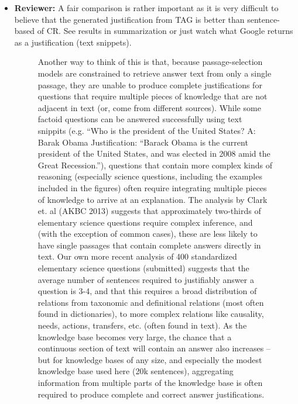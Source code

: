 \documentclass[10pt]{article}
\begin{document}
\begin{itemize}
\begin{itemize}
        \item \textbf{Reviewer:} A fair comparison is rather important as it is very difficult to believe
that the generated justification from TAG is better than sentence-based of
CR. See results in summarization or just watch what Google returns as a
justification (text snippets).

\begin{figure}[H]
\caption{ Another way to think of this is that, because passage-selection models are constrained to retrieve answer text from only a single passage, they are unable to produce complete justifications for questions that require multiple pieces of knowledge that are not adjacent in text (or, come from different sources).  While some factoid questions can be answered successfully using text snippits (e.g. ``Who is the president of the United States?  A: Barak Obama  Justification: ``Barack Obama is the current president of the United States, and was elected in 2008 amid the Great Recession.''), questions that contain more complex kinds of reasoning (especially science questions, including the examples included in the figures) often require integrating multiple pieces of knowledge to arrive at an explanation.  The analysis by Clark et. al (AKBC 2013) suggests that approximately two-thirds of elementary science questions require complex inference, and (with the exception of common cases), these are less likely to have single passages that contain complete answers directly in text.  Our own more recent analysis of 400 standardized elementary science questions (submitted) suggests that the average number of sentences required to justifiably answer a question is 3-4, and that this requires a broad distribution of relations from taxonomic and definitional relations (most often found in dictionaries), to more complex relations like causality, needs, actions, transfers, etc. (often found in text).  As the knowledge base becomes very large, the chance that a continuous section of text will contain an answer also increases -- but for knowledge bases of any size, and especially the modest knowledge base used here (20k sentences), aggregating information from multiple parts of the knowledge base is often required to produce complete and correct answer justifications. }
\end{figure}

\end{itemize}

\end{itemize}
\end{document}
